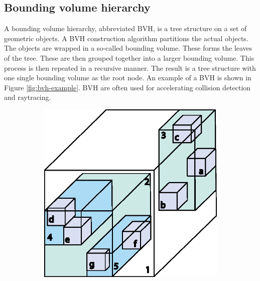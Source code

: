 \subsection{Bounding volume hierarchy }
A bounding volume hierarchy, abbreviated BVH, is a tree structure on a set of geometric objects. A BVH construction algorithm partitions the actual objects. The objects are wrapped in a so-called bounding volume. These forms the leaves of the tree. These are then grouped together into a larger bounding volume. This process is then repeated in a recursive manner. The result is a tree structure with one single bounding volume as the root node. An example of a BVH is shown in Figure \ref{fig:bvh-example}. BVH are often used for accelerating collision detection and raytracing.

\begin{figure}[h]
    \centering
    \begin{subfigure}[c]{0.37\textwidth}
        \vspace{0pt}
        \centering
        \includegraphics[width=\textwidth]{sections/theory/figures/bvh-cube.eps}
    \end{subfigure}
    \hspace{1cm}
    \begin{subfigure}[c]{0.45\textwidth}
        \vspace{0pt}
        \centering

\end{subfigure}
\end{figure}
